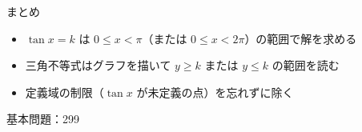 \documentclass[aspectratio=43,professionalfonts,handout]{beamer}
\begin{document}
\begin{frame}{まとめ}
  \begin{itemize}
    \item $\tan x = k$ は $0 \leq x < \pi$（または $0 \leq x < 2\pi$）の範囲で解を求める
    \item 三角不等式はグラフを描いて $y \geq k$ または $y \leq k$ の範囲を読む
    \item 定義域の制限（$\tan x$ が未定義の点）を忘れずに除く
  \end{itemize}

  \vfill
  {\small 基本問題：299}
\end{frame}
\end{document}
